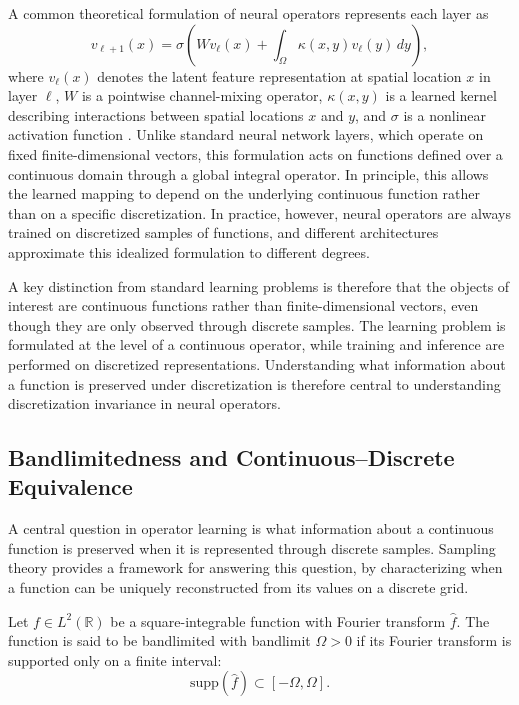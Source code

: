 A common theoretical formulation of neural operators represents each layer as
\begin{equation}
    \label{eq:og-formulation}
v_{\ell+1}(x)=\sigma\left(Wv_\ell(x)+\int_{\Omega}\kappa(x,y)v_\ell(y)\,dy\right),
\end{equation}
where $v_\ell(x)$ denotes the latent feature representation at spatial location $x$ in layer $\ell$, $W$ is a pointwise channel-mixing operator, $\kappa(x,y)$ is a learned kernel describing interactions between spatial locations $x$ and $y$, and $\sigma$ is a nonlinear activation function \cite{neural-operators}. Unlike standard neural network layers, which operate on fixed finite-dimensional vectors, this formulation acts on functions defined over a continuous domain through a global integral operator. In principle, this allows the learned mapping to depend on the underlying continuous function rather than on a specific discretization. In practice, however, neural operators are always trained on discretized samples of functions, and different architectures approximate this idealized formulation to different degrees.

A key distinction from standard learning problems is therefore that the objects of interest are continuous functions rather than finite-dimensional vectors, even though they are only observed through discrete samples. The learning problem is formulated at the level of a continuous operator, while training and inference are performed on discretized representations. Understanding what information about a function is preserved under discretization is therefore central to understanding discretization invariance in neural operators.

\subsection{Bandlimitedness and Continuous--Discrete Equivalence}\label{sec:bandlimitedness}

A central question in operator learning is what information about a continuous function is preserved when it is represented through discrete samples. Sampling theory provides a framework for answering this question, by characterizing when a function can be uniquely reconstructed from its values on a discrete grid.



Let $f \in L^2(\mathbb{R})$ be a square-integrable function with Fourier transform $\hat{f}$. The function is said to be bandlimited with bandlimit $\Omega > 0$ if its Fourier transform is supported only on a finite interval:
\begin{equation}
\mathrm{supp}(\hat{f}) \subset [-\Omega, \Omega].
\end{equation}

